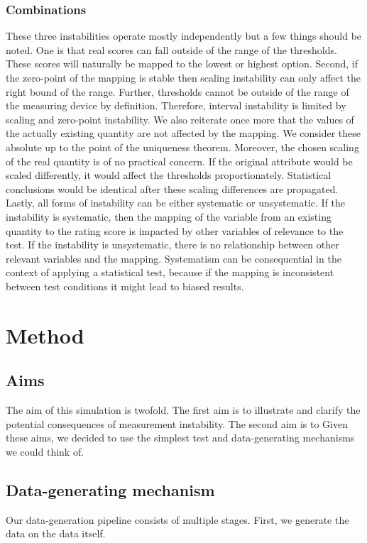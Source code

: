 \documentclass[utf8]{FrontiersinVancouver}
\begin{document}
\subsubsection{Combinations}
These three instabilities operate mostly independently but a few things should be noted. One is that real scores can fall outside of the range of the thresholds. These scores will naturally be mapped to the lowest or highest option. Second, if the zero-point of the mapping is stable then scaling instability can only affect the right bound of the range. Further, thresholds cannot be outside of the range of the measuring device by definition. Therefore, interval instability is limited by scaling and zero-point instability. We also reiterate once more that the values of the actually existing quantity are not affected by the mapping. We consider these absolute up to the point of the uniqueness theorem. Moreover, the chosen scaling of the real quantity is of no practical concern. If the original attribute would be scaled differently, it would affect the thresholds proportionately. Statistical conclusions would be identical after these scaling differences are propagated. Lastly, all forms of instability can be either systematic or unsystematic. If the instability is systematic, then the mapping of the variable from an existing quantity to the rating score is impacted by other variables of relevance to the test. If the instability is unsystematic, there is no relationship between other relevant variables and the mapping. Systematism can be consequential in the context of applying a statistical test, because if the mapping is inconsistent between test conditions it might lead to biased results. 

\section{Method}


\subsection{Aims}
The aim of this simulation is twofold. The first aim is to illustrate and clarify the potential consequences of measurement instability. The second aim is to  Given these aims, we decided to use the simplest test and data-generating mechanisms we could think of. 

\subsection{Data-generating mechanism}
Our data-generation pipeline consists of multiple stages. First, we generate the data on the data itself. 
\end{document}
